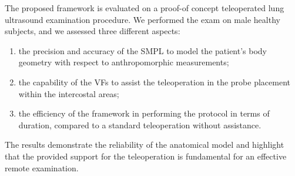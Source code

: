 \noindent The proposed framework is evaluated on a proof-of concept teleoperated lung ultrasound examination procedure. We performed the exam on male healthy subjects, and we assessed three different aspects:
\begin{enumerate}
    \item the precision and accuracy of the SMPL to model the patient's body geometry with respect to anthropomorphic measurements;
    \item the capability of the VFs to assist the teleoperation in the probe placement within the intercostal areas;
    \item the efficiency of the framework in performing the protocol in terms of duration, compared to a standard teleoperation without assistance.
\end{enumerate}
The results demonstrate the reliability of the anatomical model and highlight that the provided support for the teleoperation is fundamental for an effective remote examination. 


